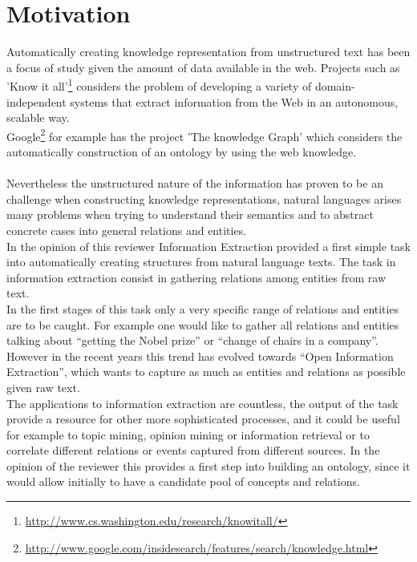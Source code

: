 \documentclass[4pt,a4paper,twocolumn]{article}
\begin{document}
\section{Motivation}

Automatically creating knowledge representation from unstructured text has been a focus of study given the amount of data available in the web.
Projects such as 'Know it all'\footnote{\url{http://www.cs.washington.edu/research/knowitall/}} considers the problem of developing a variety of domain-independent systems that extract information from the Web in an autonomous, scalable way.\\ Google\footnote{\url{http://www.google.com/insidesearch/features/search/knowledge.html}} for example has the project 'The knowledge Graph' which considers the automatically construction of an ontology by using the web knowledge. \\
\\
Nevertheless the unstructured nature of the information has proven to be an challenge when constructing knowledge representations, natural languages arises many problems when trying to understand their semantics and to abstract concrete cases into general relations and entities.\\
In the opinion of this reviewer Information Extraction provided a first simple task into automatically creating structures from natural language texts. The task in information extraction consist in gathering  relations among entities from raw text.\\
In the first stages of this task only a very specific range of relations and entities are to be caught.
For example one would like to gather all relations and entities talking about  ``getting the Nobel prize'' or ``change of chairs in a company''.\\
However in the recent years this trend has evolved towards ``Open Information Extraction'', which wants to capture as much as entities and relations as possible given raw text.\\
The applications to information extraction are countless, the output of the task provide a resource for other more sophisticated processes, and it could be useful for example to topic mining, opinion mining or information retrieval or to correlate different relations or events captured from different sources.
In the opinion of the reviewer this provides a first step into building an ontology, since it would allow initially to have a candidate pool of concepts and relations.\\
\end{document}

